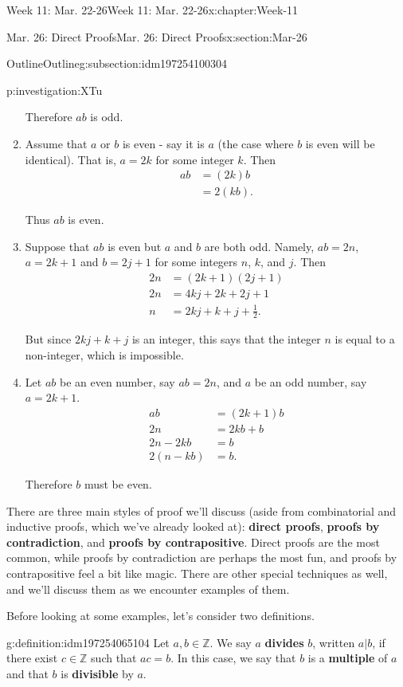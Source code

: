 \documentclass[oneside,10pt,]{book}
\newcommand{\terminology}[1]{\textbf{#1}}
\numberwithin{equation}{section}
\def\Z{{\mathbb Z}}
\newcommand{\Z}{\mathbb Z}
\newcommand{\amp}{&}
\begin{document}
\begin{chapterptx}{Week 11: Mar. 22-26}{}{Week 11: Mar. 22-26}{}{}{x:chapter:Week-11}
\begin{sectionptx}{Mar. 26: Direct Proofs}{}{Mar. 26: Direct Proofs}{}{}{x:section:Mar-26}
\begin{subsectionptx}{Outline}{}{Outline}{}{}{g:subsection:idm197254100304}
\begin{investigation}{}{p:investigation:XTu}
\begin{enumerate}
%
\par
Therefore \(ab\) is odd.%
\item{}Assume that \(a\) or \(b\) is even - say it is \(a\) (the case where \(b\) is even will be identical). That is, \(a=2k\) for some integer \(k\). Then%
\begin{align*}
ab \amp =(2k)b\\
\amp =2(kb)\text{.}
\end{align*}
%
\par
Thus \(ab\) is even.%
\item{}Suppose that \(ab\) is even but \(a\) and \(b\) are both odd. Namely, \(ab = 2n\), \(a=2k+1\) and \(b=2j+1\) for some integers \(n\), \(k\), and \(j\). Then%
\begin{align*}
2n \amp =(2k+1)(2j+1)\\
2n \amp =4kj+2k+2j+1\\
n \amp = 2kj+k+j+\frac{1}{2}\text{.}
\end{align*}
%
\par
But since \(2kj+k+j\) is an integer, this says that the integer \(n\) is equal to a non-integer, which is impossible.%
\item{}Let \(ab\) be an even number, say \(ab=2n\), and \(a\) be an odd number, say \(a=2k+1\).%
\begin{align*}
ab \amp =(2k+1)b\\
2n \amp =2kb+b\\
2n-2kb\amp =b\\
2(n-kb)\amp =b\text{.}
\end{align*}
%
\par
Therefore \(b\) must be even.%
\end{enumerate}
%
\end{investigation}%
There are three main styles of proof we'll discuss (aside from combinatorial and inductive proofs, which we've already looked at): \terminology{direct proofs}, \terminology{proofs by contradiction}, and \terminology{proofs by contrapositive}. Direct proofs are the most common, while proofs by contradiction are perhaps the most fun, and proofs by contrapositive feel a bit like magic. There are other special techniques as well, and we'll discuss them as we encounter examples of them.%
\par
Before looking at some examples, let's consider two definitions.%
\begin{definition}{}{g:definition:idm197254065104}%
Let \(a,b\in\Z\). We say \(a\) \terminology{divides} \(b\), written \(a | b\), if there exist \(c\in\Z\) such that \(ac = b\). In this case, we say that \(b\) is a \terminology{multiple} of \(a\) and that \(b\) is \terminology{divisible} by \(a\).%

\end{definition}
\end{subsectionptx}
\end{sectionptx}
\end{chapterptx}
\end{document}
